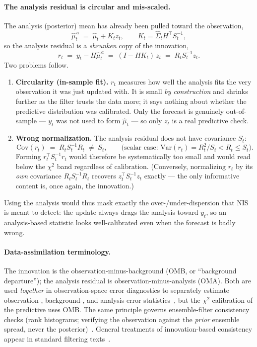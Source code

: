 \documentclass{article}
\begin{document}
\paragraph{The analysis residual is circular and mis-scaled.}
The analysis (posterior) mean has already been pulled toward the observation,
\[
  \hat\mu^{\,a}_t \;=\; \hat\mu_t + K_t z_t, \qquad K_t = \hat\Sigma_t H^\top S_t^{-1},
\]
so the analysis residual is a \emph{shrunken} copy of the innovation,
\[
  r_t \;=\; y_t - H\hat\mu^{\,a}_t \;=\; (I - H K_t)\,z_t \;=\; R_t S_t^{-1} z_t .
\]
Two problems follow.
\begin{enumerate}
  \item \textbf{Circularity (in-sample fit).} $r_t$ measures how well the analysis fits the
  very observation it was just updated with. It is small \emph{by construction} and shrinks
  further as the filter trusts the data more; it says nothing about whether the predictive
  distribution was calibrated. Only the forecast is genuinely out-of-sample --- $y_t$ was
  not used to form $\hat\mu_t$ --- so only $z_t$ is a real predictive check.
  \item \textbf{Wrong normalization.} The analysis residual does not have covariance $S_t$:
  \[
    \mathrm{Cov}(r_t) \;=\; R_t S_t^{-1} R_t \;\ne\; S_t,
    \qquad\text{(scalar case: } \mathrm{Var}(r_t)=R_t^2/S_t < R_t \le S_t).
  \]
  Forming $r_t^\top S_t^{-1} r_t$ would therefore be systematically too small and would read
  below the $\chi^2$ band regardless of calibration. (Conversely, normalizing $r_t$ by its
  \emph{own} covariance $R_t S_t^{-1} R_t$ recovers $z_t^\top S_t^{-1} z_t$ exactly --- the
  only informative content is, once again, the innovation.)
\end{enumerate}
Using the analysis would thus mask exactly the over-/under-dispersion that NIS is meant to
detect: the update always drags the analysis toward $y_t$, so an analysis-based statistic
looks well-calibrated even when the forecast is badly wrong.

\paragraph{Data-assimilation terminology.}
The innovation is the observation-minus-background (OMB, or ``background departure''); the
analysis residual is observation-minus-analysis (OMA). Both are used \emph{together} in
observation-space error diagnostics to separately estimate observation-, background-, and
analysis-error statistics~\cite{desroziers2005}, but the $\chi^2$ calibration of the
predictive uses OMB. The same principle governs ensemble-filter consistency checks (rank
histograms; verifying the observation against the \emph{prior} ensemble spread, never the
posterior)~\cite{anderson2001}. General treatments of innovation-based consistency appear in
standard filtering texts~\cite{sarkka2013}.
\end{document}
